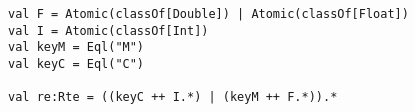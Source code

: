\begin{lstlisting}[style=reclojureScala]
val F = Atomic(classOf[Double]) | Atomic(classOf[Float])
val I = Atomic(classOf[Int])
val keyM = Eql("M")
val keyC = Eql("C")

val re:Rte = ((keyC ++ I.*) | (keyM ++ F.*)).*
\end{lstlisting}
